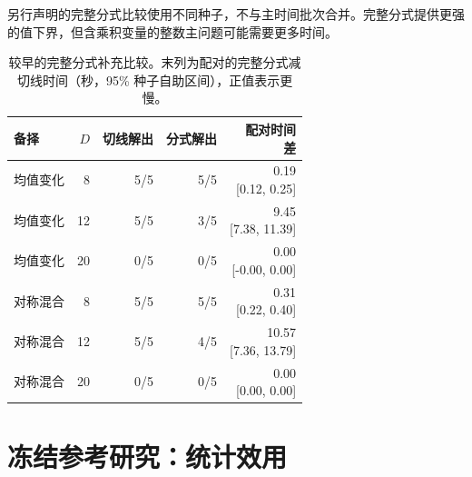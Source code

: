 \documentclass[11pt,a4paper]{article}
\begin{document}
另行声明的完整分式比较使用不同种子，不与主时间批次合并。完整分式提供更强的值下界，但含乘积变量的整数主问题可能需要更多时间。
\begin{table}[tbp]\centering\small\setlength{\tabcolsep}{3.5pt}
\caption{较早的完整分式补充比较。末列为配对的完整分式减切线时间（秒，95\% 种子自助区间），正值表示更慢。}\label{tab:reference-ratio}
\begin{tabularx}{\linewidth}{@{}p{24mm}rrrr@{}}
\toprule 备择 & $D$ & 切线解出 & 分式解出 & \shortstack{配对时间\\差} \\
\midrule
均值变化 & 8 & 5/5 & 5/5 & \shortstack{0.19\\{[0.12, 0.25]}} \\
均值变化 & 12 & 5/5 & 3/5 & \shortstack{9.45\\{[7.38, 11.39]}} \\
均值变化 & 20 & 0/5 & 0/5 & \shortstack{0.00\\{[-0.00, 0.00]}} \\
对称混合 & 8 & 5/5 & 5/5 & \shortstack{0.31\\{[0.22, 0.40]}} \\
对称混合 & 12 & 5/5 & 4/5 & \shortstack{10.57\\{[7.36, 13.79]}} \\
对称混合 & 20 & 0/5 & 0/5 & \shortstack{0.00\\{[0.00, 0.00]}} \\
\bottomrule\end{tabularx}\end{table}


\FloatBarrier
\section{冻结参考研究：统计效用}\label{sec:statistics}
\end{document}
